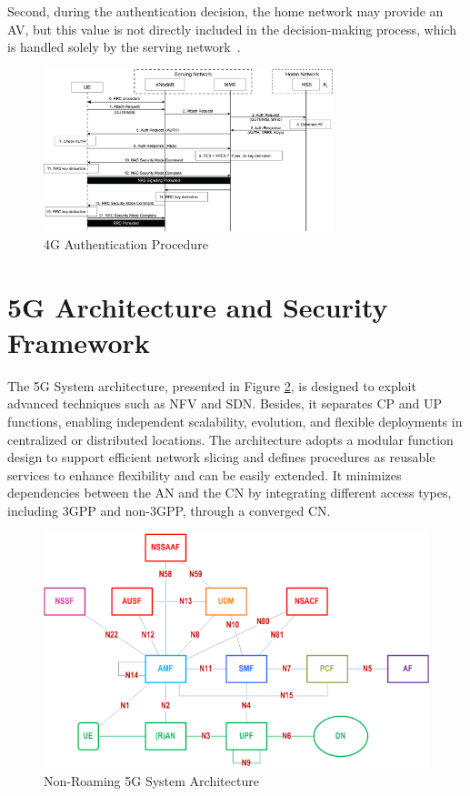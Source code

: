 Second, during the authentication decision, the home network may provide an \ac{AV}, but this value is not directly included in the decision-making process, which is handled solely by the serving network~\cite{cbl-comp-p4}.

\begin{figure}[htbp]
    \centering
    \includegraphics[width=0.75\textwidth]{figs/4G-authentication-procedure.png}
    \caption{\acs{4G} Authentication Procedure}
    \label{fig:4G-authentication-procedure}
\end{figure}

\section{\acs{5G} Architecture and Security Framework}

The \ac{5G} System architecture, presented in Figure \ref{fig:5G-system-architecture}, is designed to exploit advanced techniques such as \ac{NFV} and \ac{SDN}. Besides, it separates \ac{CP} and \ac{UP} functions, enabling independent scalability, evolution, and flexible deployments in centralized or distributed locations. The architecture adopts a modular function design to support efficient network slicing and defines procedures as reusable services to enhance flexibility and can be easily extended. It minimizes dependencies between the \ac{AN} and the \ac{CN} by integrating different access types, including \ac{3GPP} and non-\ac{3GPP}, through a converged \ac{CN}.

\begin{figure}
    \centering
    \includegraphics[width=0.75\linewidth]{figs/5g-system-architecture.png}
    \caption{Non-Roaming \acs{5G} System Architecture}
    \label{fig:5G-system-architecture}
\end{figure}

